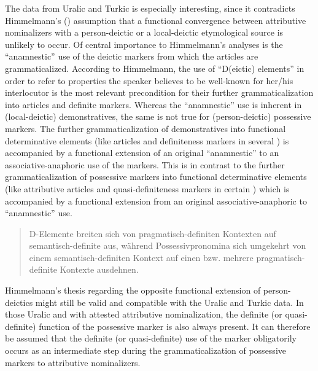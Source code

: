 {
The data from Uralic and Turkic is especially interesting, since it contradicts Himmelmann's (\citeyear[220–221]{himmelmann1997}) assumption that a functional convergence between attributive nominalizers with a person-deictic or a local-deictic etymological source is unlikely to occur. Of central importance to Himmelmann's analyses is the “anamnestic” use of the deictic markers from which the articles are grammaticalized. According to Himmelmann, the use of “D(eictic) elements” in order to refer to properties the speaker believes to be well-known for her/his interlocutor is the most relevant precondition for their further grammaticalization into articles and definite markers. Whereas the “anamnestic” use is inherent in (local-deictic) demonstratives, the same is not true for (person-deictic) possessive markers. The further grammaticalization of demonstratives into functional determinative elements (like articles and definiteness markers in several ) is accompanied by a functional extension of an original “anamnestic” to an associative-anaphoric use of the markers. This is in contrast to the further grammaticalization of possessive markers into functional determinative elements (like attributive articles and quasi-definiteness markers in certain ) which is accompanied by a functional extension from an original associative-anaphoric to “anamnestic” use.
\begin{quote}
D-Elemente breiten sich von pragmatisch-definiten Kontexten auf semantisch-definite aus, während Possessivpronomina sich umgekehrt von einem semantisch-definiten Kontext auf einen bzw. mehrere pragmatisch-definite Kontexte ausdehnen. \citep[221]{himmelmann1997}
\end{quote}
Himmelmann's thesis regarding the opposite functional extension of person-deictics might still be valid and compatible with the Uralic and Turkic data. In those Uralic and  with attested attributive nominalization, the definite (or quasi-definite) function of the possessive marker is also always present. It can therefore be assumed that the definite (or quasi-definite) use of the marker obligatorily occurs as an intermediate step during the grammaticalization of possessive markers to attributive nominalizers.
\begin{itemize}

\end{itemize}}
